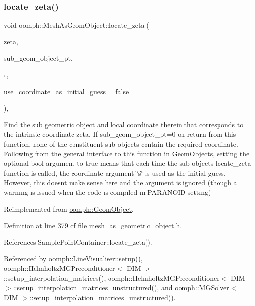 \subsubsection{\texorpdfstring{locate\+\_\+zeta()}{locate\_zeta()}}
{\footnotesize\ttfamily void oomph\+::\+Mesh\+As\+Geom\+Object\+::locate\+\_\+zeta (\begin{DoxyParamCaption}\item[{const \hyperlink{classoomph_1_1Vector}{Vector}$<$ double $>$ \&}]{zeta,  }\item[{\hyperlink{classoomph_1_1GeomObject}{Geom\+Object} $\ast$\&}]{sub\+\_\+geom\+\_\+object\+\_\+pt,  }\item[{\hyperlink{classoomph_1_1Vector}{Vector}$<$ double $>$ \&}]{s,  }\item[{const bool \&}]{use\+\_\+coordinate\+\_\+as\+\_\+initial\+\_\+guess = {\ttfamily false} }\end{DoxyParamCaption})\hspace{0.3cm}{\ttfamily [inline]}, {\ttfamily [virtual]}}



Find the sub geometric object and local coordinate therein that corresponds to the intrinsic coordinate zeta. If sub\+\_\+geom\+\_\+object\+\_\+pt=0 on return from this function, none of the constituent sub-\/objects contain the required coordinate. Following from the general interface to this function in Geom\+Objects, setting the optional bool argument to true means that each time the sub-\/object\textquotesingle{}s locate\+\_\+zeta function is called, the coordinate argument \char`\"{}s\char`\"{} is used as the initial guess. However, this doesn\textquotesingle{}t make sense here and the argument is ignored (though a warning is issued when the code is compiled in P\+A\+R\+A\+N\+O\+ID setting) 



Reimplemented from \hyperlink{classoomph_1_1GeomObject_a78ee9f98bcfd0c5e1f07a459777663d3}{oomph\+::\+Geom\+Object}.



Definition at line 379 of file mesh\+\_\+as\+\_\+geometric\+\_\+object.\+h.



References Sample\+Point\+Container\+::locate\+\_\+zeta().



Referenced by oomph\+::\+Line\+Visualiser\+::setup(), oomph\+::\+Helmholtz\+M\+G\+Preconditioner$<$ D\+I\+M $>$\+::setup\+\_\+interpolation\+\_\+matrices(), oomph\+::\+Helmholtz\+M\+G\+Preconditioner$<$ D\+I\+M $>$\+::setup\+\_\+interpolation\+\_\+matrices\+\_\+unstructured(), and oomph\+::\+M\+G\+Solver$<$ D\+I\+M $>$\+::setup\+\_\+interpolation\+\_\+matrices\+\_\+unstructured().

